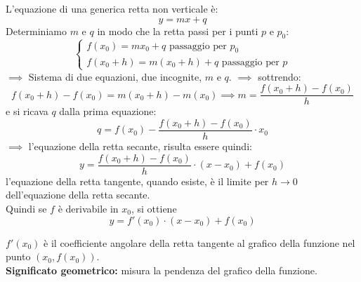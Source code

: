 \documentclass[../../main.tex]{subfiles}
\begin{document}
L'equazione di una generica retta non verticale è:
\[
    y = mx + q
\]
Determiniamo $m$ e $q$ in modo che la retta passi per i punti $p$ e $p_0$:
\[
    \begin{cases}
        f(x_0) = mx_0 + q \text{ passaggio per } p_0 \\
        f(x_0 + h) = m(x_0 + h) + q \text{ passaggio per } p
    \end{cases}
\]
$\implies$ Sistema di due equazioni, due incognite, $m$ e $q$.
$\implies$ sottrendo:
\[
    f(x_0 + h) - f(x_0) = m(x_0+h) - m(x_0) \implies m = \dfrac{f(x_0 + h) - f(x_0)}{h}
\]
e si ricava $q$ dalla prima equazione:
\[
    q = f(x_0) - \dfrac{f(x_0+h) - f(x_0)}{h} \cdot x_0
\]
$\implies$ l'equazione della retta secante, risulta essere quindi:
\[
    y = \dfrac{f(x_0 + h) - f(x_0)}{h} \cdot (x-x_0) + f(x_0)
\]
l'equazione della retta tangente, quando esiste, è il limite per $h\to 0$ dell'equazione della retta secante.\\
Quindi se $f$ è derivabile in $x_0$, si ottiene
\[
    y = f'(x_0) \cdot (x-x_0) + f(x_0)
\]
\begin{center}
\end{center}
$f'(x_0)$ è il coefficiente angolare della retta tangente al grafico della funzione nel punto $(x_0, f(x_0))$.\\
\textbf{Significato geometrico:} misura la pendenza del grafico della funzione.
\end{document}
